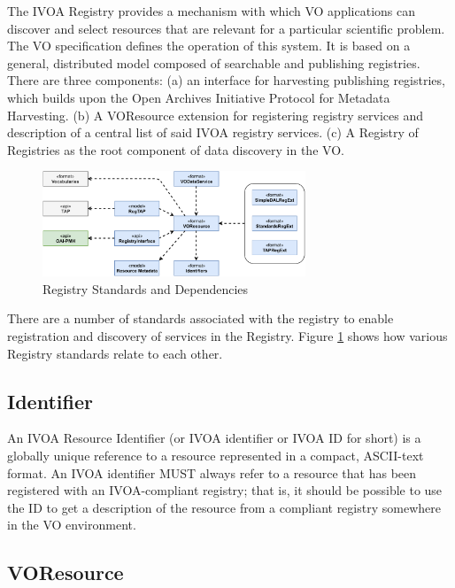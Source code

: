 \documentclass[11pt,letter]{ivoa}
\begin{document}
The IVOA Registry provides a mechanism with which VO applications can discover and select 
resources that are relevant for a particular scientific problem. The VO specification defines 
the operation of this system. It is based on a general, distributed model composed of searchable 
and publishing registries. There are three components: (a) an interface for harvesting publishing 
registries, which builds upon the Open Archives Initiative Protocol for Metadata Harvesting. 
(b) A VOResource extension for registering registry services and description of a central list 
of said IVOA registry services. (c) A Registry of Registries as the root component of data discovery 
in the VO. 

\begin{figure}[ht]
\centering
\includegraphics[width=0.70\textwidth]{ivoa-arch-registry.pdf}
\caption{Registry Standards and Dependencies}
\label{fig:regdeps}
\end{figure}

There are a number of standards associated with the registry to enable registration and discovery 
of services in the Registry.  Figure \ref{fig:regdeps} shows how various Registry standards relate to each other.

\subsection{Identifier}

An IVOA Resource Identifier (or IVOA identifier or IVOA ID for short) \citep{2016ivoa.spec.0523D} is a globally unique reference 
to a resource represented in a compact, ASCII-text format.  An IVOA identifier MUST always refer to 
a resource that has been registered with an IVOA-compliant registry; that is, it should be possible 
to use the ID to get a description of the resource from a compliant registry somewhere in the VO 
environment.

\subsection{VOResource}
\end{document}
